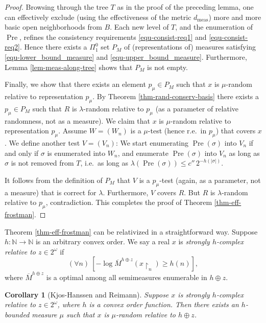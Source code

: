 \documentclass[11pt,reqno]{article}
\theoremstyle{plain}
\newtheorem*{cor*}{Corollary}
\theoremstyle{definition}
\theoremstyle{remark}
\numberwithin{equation}{section}
\newcommand{\Nat}{\ensuremath{\mathbb{N}}}
\newcommand{\Cant}{\ensuremath{2^{\omega}}}
\newcommand{\Rest}[1]{\ensuremath{\!\restriction_{#1}}}
\newcommand{\Leb}{\ensuremath{\lambda}}
\DeclareMathOperator{\Pre}{Pre}
\DeclareMathOperator{\meas}{meas}
\begin{document}
\begin{proof}
	Browsing through the tree $T$ as in the proof of the preceding lemma, one can effectively exclude (using the effectiveness of the metric $d_{\meas}$) more and more basic open neighborhoods from $B$. Each new level of $T$, and the enumeration of $\Pre$, refines the consistency requirements \eqref{equ-consist-req1} and \eqref{equ-consist-req2}. Hence there exists a $\Pi^0_1$ set $P_M$ of (representations of) measures satisfying \eqref{equ-lower_bound_measure} and \eqref{equ-upper_bound_measure}. Furthermore, Lemma \ref{lem-meas-along-tree} shows that $P_M$ is not empty.
		
	Finally, we show that there exists an element $p_\mu \in P_M$ such that $x$ is $\mu$-random relative to representation $p_\mu$. By Theorem \ref{thm-rand-conserv-basis} there exists a $p_\mu \in P_M$ such that $R$ is $\Leb$-random relative to $p_\mu$ (as a parameter of relative randomness, not as a measure). We claim that $x$ is $\mu$-random relative to representation $p_\mu$. Assume $W= (W_n)$ is a $\mu$-test (hence r.e.\ in $p_\mu$) that covers $x$. We define another test $V= (V_n)$: We start enumerating $\Pre(\sigma)$ into $V_n$ if and only if $\sigma$ is enumerated into $W_n$, and enumerate $\Pre(\sigma)$ into $V_n$ as long as $\sigma$ is not removed from $T$, i.e.\ as long as $\Leb(\Pre(\sigma)) \leq c''\, 2^{-h(|\sigma|)}$.
	
	It follows from the definition of $P_M$ that $V$ is a $p_\mu$-test (again, as a parameter, not a measure) that is correct for $\Leb$. Furthermore, $V$ covers $R$. But $R$ is $\Leb$-random relative to $p_\mu$, contradiction. This completes the proof of Theorem \ref{thm-eff-frostman}.
	 \end{proof}
	

Theorem \ref{thm-eff-frostman} can be relativized in a straightforward way. Suppose $h: \Nat \to \Nat$ is an arbitrary convex order. We say a real $x$ is \emph{strongly $h$-complex relative to $z \in \Cant$} if 
\[
	(\forall n)\: [ -\log \overline{M}^{h\oplus z}(x\Rest{n}) \geq h(n)],
\]
where $\overline{M}^{h\oplus z}$ is a optimal among all semimeasures enumerable in $h\oplus z$.


\begin{cor*}[Kjos-Hanssen and Reimann] \label{cor-relative-frostman} 
	Suppose $x$ is strongly $h$-complex relative to $z \in \Cant$, where $h$ is a convex order function.  Then there exists an $h$-bounded measure $\mu$ such that $x$ is $\mu$-random relative to $h\oplus z$.
\end{cor*}
	
\end{document}
